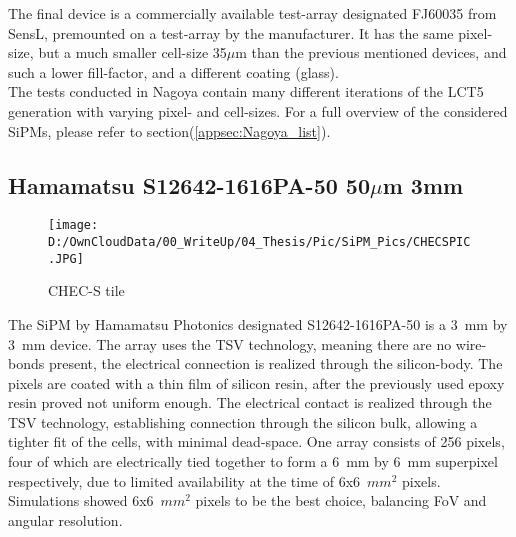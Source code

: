 \documentclass[12pt,article,type=msc,colorback,accentcolor=tud9c]{tudthesis}
\begin{document}
The final device is a commercially available test-array designated FJ60035 from SensL, premounted on a test-array by the manufacturer. It has the same pixel-size, but a much smaller cell-size 35$\mu$m than the previous mentioned devices, and such a lower fill-factor, and a different coating (glass).\\

The tests conducted in Nagoya contain many different iterations of the LCT5 generation with varying pixel- and cell-sizes\cite{Hiro}.
For a full overview of the considered SiPMs, please refer to section(\ref{appsec:Nagoya_list}).



\clearpage
\subsection{Hamamatsu S12642-1616PA-50 50$\mu$m 3mm}
\begin{wrapfigure}{R}{0.3\textwidth}
\centering
\texttt{[image: D:/OwnCloudData/00\_WriteUp/04\_Thesis/Pic/SiPM\_Pics/CHECSPIC.JPG]}
\caption[CHEC-S SiPM]{\label{fig:CHECSTILE}CHEC-S tile}
\end{wrapfigure}
The SiPM by Hamamatsu Photonics designated S12642-1616PA-50 is a 3~mm by 3~mm device. The array uses the TSV technology, meaning there are no wire-bonds present, the electrical connection is realized through the silicon-body. The pixels are coated with a thin film of silicon resin, after the previously used epoxy resin proved not uniform enough. The electrical contact is realized through the TSV technology, establishing connection through the silicon bulk, allowing a tighter fit of the cells, with minimal dead-space. One array consists of 256 pixels, four of which are electrically tied together to form a 6~mm by 6~mm superpixel respectively, due to limited availability at the time of 6x6~$mm^2$ pixels. Simulations showed 6x6~$mm^2$ pixels to be the best choice, balancing FoV and angular resolution. 
\end{document}
